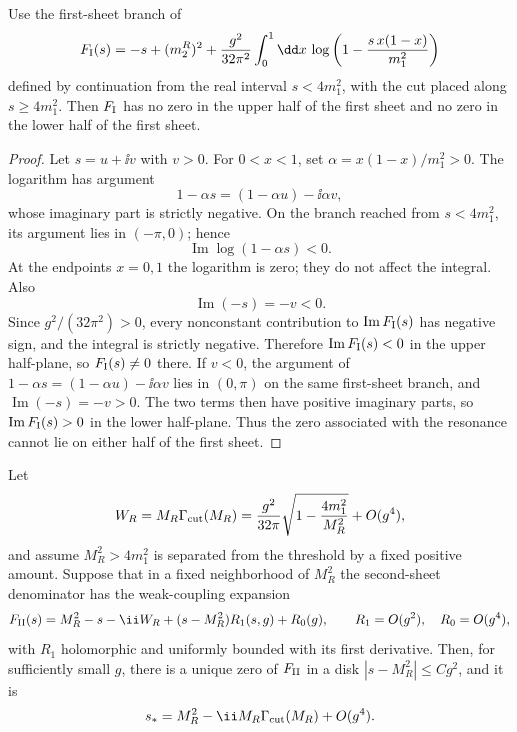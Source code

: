 \begin{proposition}
\label{prop:no-first-sheet-resonance-zero-scalar-model}
Use the first-sheet branch of
\[
  F_{\rm I}(s)
  =
  -s+(m_2^R)^2
  +
  \frac{g^2}{32\pi^2}
  \int_0^1\dd x\,
  \log\left(1-\frac{s\,x(1-x)}{m_1^2}\right)
\]
defined by continuation from the real interval \(s<4m_1^2\), with the cut
placed along \(s\ge4m_1^2\).  Then \(F_{\rm I}\) has no zero in the upper
half of the first sheet and no zero in the lower half of the first sheet.
\end{proposition}

\begin{proof}
Let \(s=u+\ii v\) with \(v>0\).  For \(0<x<1\), set
\(\alpha=x(1-x)/m_1^2>0\).  The logarithm has argument
\[
  1-\alpha s=(1-\alpha u)-\ii\alpha v,
\]
whose imaginary part is strictly negative.  On the branch reached from
\(s<4m_1^2\), its argument lies in \((-\pi,0)\); hence
\[
  \operatorname{Im}\log(1-\alpha s)<0 .
\]
At the endpoints \(x=0,1\) the logarithm is zero; they do not affect the
integral.  Also
\[
  \operatorname{Im}(-s)=-v<0 .
\]
Since \(g^2/(32\pi^2)>0\), every nonconstant contribution to
\(\operatorname{Im}F_{\rm I}(s)\) has negative sign, and the integral is
strictly negative.  Therefore \(\operatorname{Im}F_{\rm I}(s)<0\) in the
upper half-plane, so \(F_{\rm I}(s)\neq0\) there.  If \(v<0\), the argument
of \(1-\alpha s=(1-\alpha u)-\ii\alpha v\) lies in \((0,\pi)\) on the same
first-sheet branch, and \(\operatorname{Im}(-s)=-v>0\).  The two terms then
have positive imaginary parts, so \(\operatorname{Im}F_{\rm I}(s)>0\) in the
lower half-plane.  Thus the zero associated with the resonance cannot lie on
either half of the first sheet.
\end{proof}

\begin{proposition}
\label{prop:second-sheet-narrow-pole-newton}
Let
\[
  W_R=M_R\Gamma_{\rm cut}(M_R)
  =
  \frac{g^2}{32\pi}
  \sqrt{1-\frac{4m_1^2}{M_R^2}}
  +O(g^4),
\]
and assume \(M_R^2>4m_1^2\) is separated from the threshold by a fixed
positive amount.  Suppose that in a fixed neighborhood of \(M_R^2\) the
second-sheet denominator has the weak-coupling expansion
\[
  F_{\rm II}(s)
  =
  M_R^2-s-\ii W_R
  +(s-M_R^2)R_1(s,g)+R_0(g),
  \qquad
  R_1=O(g^2),\quad R_0=O(g^4),
\]
with \(R_1\) holomorphic and uniformly bounded with its first derivative.
Then, for sufficiently small \(g\), there is a unique zero of
\(F_{\rm II}\) in a disk \(|s-M_R^2|\le Cg^2\), and it is
\[
  s_\ast
  =
  M_R^2-\ii M_R\Gamma_{\rm cut}(M_R)+O(g^4).
\]
\end{proposition}

